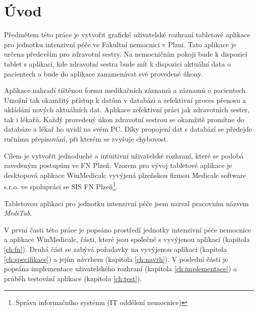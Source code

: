 \chapter*{Úvod}

Předmětem této práce je vytvořit grafické uživatelské rozhraní tabletové aplikace pro jednotku intenzivní péče ve Fakultní nemocnici v Plzni. Tato aplikace je určena především pro zdravotní sestry. Na nemocničním pokoji bude k dispozici tablet s aplikací, kde zdravotní sestra bude mít k dispozici aktuální data o pacientech a bude do aplikace zanamenávat své provedené úkony.

Aplikace nahradí tištěnou formu medikačních záznamů a záznamů o pacientech. Umožní tak okamžitý přístup k datům v databázi a zefektivní proces přenosu a ukládání nových aktuálních dat. Aplikace zefektivní práci jak zdravotních sester, tak i lékařů. Každý provedený úkon zdravotní sestrou se okamžitě promítne do databáze a lékař ho uvidí na svém PC. Díky propojení dat s databází se předejde ručnímu přepisování, při kterém se zvyšuje chybovost.

Cílem je vytvořit jednoduché a intuitivní uživatelské rozhraní, které se podobá zavedeným postupům ve FN Plzeň. Vzorem pro vývoj tabletové aplikace je desktopová aplikace WinMedicalc vyvýjená plzeňskou firmou Medicalc software s.r.o. ve spolupráci se SIS FN Plzeň\footnote{Správa informačního systému (IT oddělení nemocnice)}.

Tabletovou aplikaci pro jednotku intenzivní péče jsem nazval pracovním názvem \emph{MediTab}.

V první časti této práce je popsáno prostředí jednotky intenzivní péče nemocnice a aplikace WinMedicalc, části, které jsou společné s vyvýjenou aplikací (kapitola \ref{ch:fn}). Druhá část se zabývá požadavky na vyvýjenou aplikaci (kapitola \ref{ch:specifikace}) a jejím návrhem (kapitola \ref{ch:navrh}). V poslední části je popsána implementace uživatelského rozhraní (kapitola \ref{ch:implementace}) a průběh testování aplikace (kapitola \ref{ch:test}).